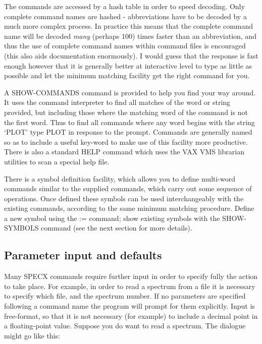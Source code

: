 \documentclass[11pt,twoside]{report}
\begin{document}
The commands are accessed by a hash table in order
to speed decoding. Only complete command names are hashed -
abbreviations have to be decoded by a much more complex process. In
practice this means that the complete command name will be decoded
{\em many} (perhaps 100) times faster than an abbreviation, and thus
the use of complete command names within command files is encouraged
(this also aids documentation enormously). I would guess that the
response is fast enough however that it is generally better at
interactive level to type as little as possible and let the minimum
matching facility get the right command for
you.

A SHOW-COMMANDS command is provided to help you
find your way around. It uses the command interpreter to find all
matches of the word or string provided, but including those where the
matching word of the command is not the first word. Thus to find all
commands where any word begins with the string `PLOT' type PLOT in
response to the prompt. Commands are generally named so as to include
a useful key-word to make use of this facility more
productive. There is also a standard HELP command which
uses the VAX VMS librarian utilities to scan a
special help file.

There is a symbol definition facility, which
allows you to define multi-word commands similar to the supplied
commands, which carry out some sequence of operations. Once defined
these symbols can be used interchangeably with the existing commands,
according to the same minimum matching
procedure. Define a new symbol using the := command; show existing
symbols with the
SHOW-SYMBOLS command (see the next section for
more details).

\subsection{Parameter input and defaults}

Many SPECX commands require further input in order to specify fully
the action to take place. For example, in order to read a spectrum
from a file it is necessary to specify which file, and the spectrum
number. If no parameters are specified following a command name the
program will prompt for them explicitly.  Input is
free-format, so that it is not necessary (for
example) to include a decimal point in a floating-point value. Suppose
you do want to read a spectrum. The dialogue might go like this:
\end{document}
